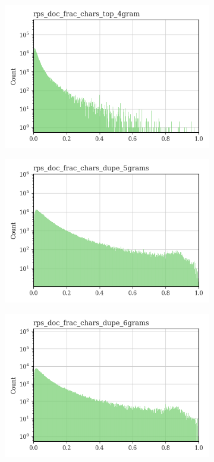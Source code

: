 \documentclass{article}
\begin{document}
\begin{figure}
\begin{subfigure}[b]{0.32\textwidth}
         \includegraphics[width=\textwidth]{figures/quality_signals/rps_doc_frac_chars_top_4gram.png}
     \end{subfigure}
     \begin{subfigure}[b]{0.32\textwidth}
         \centering
         \includegraphics[width=\textwidth]{figures/quality_signals/rps_doc_frac_chars_dupe_5grams.png}
     \end{subfigure}
     \hfill
     \begin{subfigure}[b]{0.32\textwidth}
         \centering
         \includegraphics[width=\textwidth]{figures/quality_signals/rps_doc_frac_chars_dupe_6grams.png}

\end{subfigure}
\end{figure}
\end{document}
